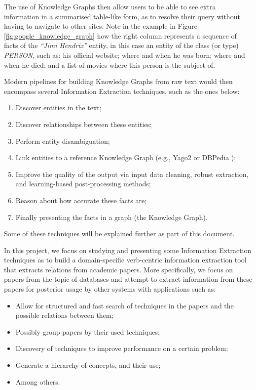 \documentclass[11pt,a4paper,openright]{memoir}
\begin{document}
The use of Knowledge Graphs then allow users to be able to see extra information in a summarised table-like form, as to resolve their query without having to navigate to other sites. Note in the example in Figure \ref{fig:google_knowledge_graph} how the right column represents a sequence of facts of the \emph{\enquote{Jimi Hendrix}} entity, in this case an entity of the class (or type) \emph{PERSON}, such as: his official website; where and when he was born; where and when he died; and a list of movies where this person is the subject of.

Modern pipelines for building Knowledge Graphs from raw text would then encompass several Information Extraction techniques, such as the ones below:
\begin{enumerate}
  \item Discover entities in the text;
  \item Discover relationships between these entities;
  \item Perform entity disambiguation;
  \item Link entities to a reference Knowledge Graph (e.g., Yago2 \cite{Suchanek2007} or DBPedia \cite{dbpedia-swj});
  \item Improve the quality of the output via input data cleaning, robust extraction, and learning-based post-processing methods;
  \item Reason about how accurate these facts are;
  \item Finally presenting the facts in a graph (the Knowledge Graph).
\end{enumerate}

Some of these techniques will be explained further as part of this document.

In this project, we focus on studying and presenting some Information Extraction techniques as to build a domain-specific verb-centric information extraction tool that extracts relations from academic papers. More specifically, we focus on papers from the topic of databases and attempt to extract information from these papers for posterior usage by other systems with applications such as:
\begin{itemize}
	\item Allow for structured and fast search of techniques in the papers and the possible relations between them;
	\item Possibly group papers by their used techniques;
	\item Discovery of techniques to improve performance on a certain problem;
	\item Generate a hierarchy of concepts, and their use;
	\item Among others.
\end{itemize}
\end{document}
